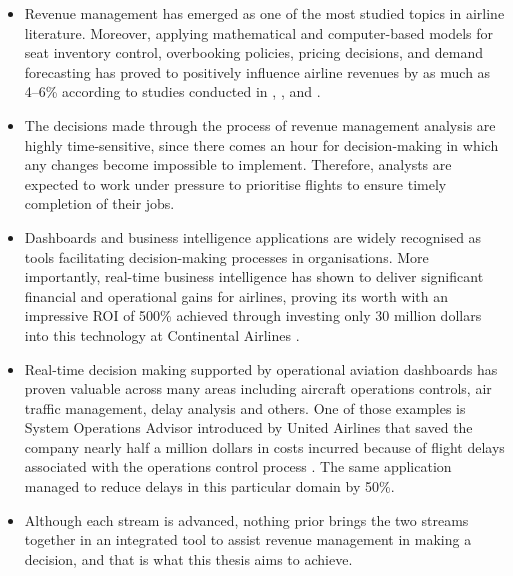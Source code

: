 \begin{itemize}
    \item Revenue management has emerged as one of the most studied topics in airline literature. Moreover, applying mathematical and computer-based models for seat inventory control, overbooking policies, pricing decisions, and demand forecasting has proved to positively influence airline revenues by as much as 4--6\% according to studies conducted in \citet{Belobaba1987, Belobaba1989}, \citet{PakPiersma2002}, and \citet{BarnhartBelobabaOdoni2003}.
    \item The decisions made through the process of revenue management analysis are highly time-sensitive, since there comes an hour for decision-making in which any changes become impossible to implement. Therefore, analysts are expected to work under pressure to prioritise flights to ensure timely completion of their jobs.
    \item Dashboards and business intelligence applications are widely recognised as tools facilitating decision-making processes in organisations. More importantly, real-time business intelligence has shown to deliver significant financial and operational gains for airlines, proving its worth with an impressive ROI of 500\% achieved through investing only 30 million dollars into this technology at Continental Airlines \citep{WatsonWixomHoffer2006}.
    \item Real-time decision making supported by operational aviation dashboards has proven valuable across many areas including aircraft operations controls, air traffic management, delay analysis and others. One of those examples is System Operations Advisor introduced by United Airlines that saved the company nearly half a million dollars in costs incurred because of flight delays associated with the operations control process \citep{RakshitKrishnamurthyYu1996}. The same application managed to reduce delays in this particular domain by 50\%.
    \item Although each stream is advanced, nothing prior brings the two streams together in an integrated tool to assist revenue management in making a decision, and that is what this thesis aims to achieve.
\end{itemize}
